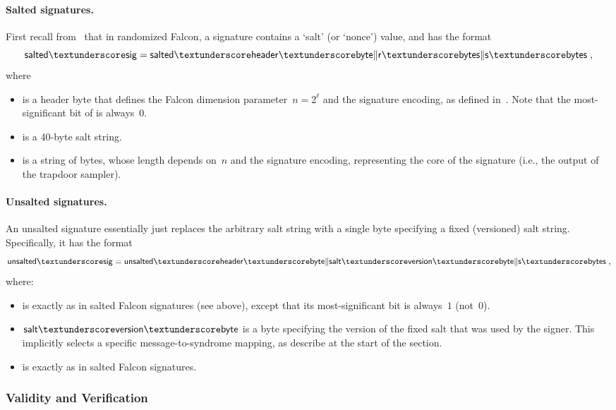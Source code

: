 \documentclass[11pt]{article}
\begin{document}
\paragraph{Salted signatures.}

First recall from~\cite[Section~3.11.3]{falcon} that in randomized
Falcon, a signature contains a `salt' (or `nonce') value, and has the
format
\[ \saltedsig = \saltedheaderbyte \| \rbytes \| \sbytes \; \text{,} \]
where
\begin{itemize}[itemsep=0pt]
\item \saltedheaderbyte is a header byte that defines the Falcon dimension
  parameter~$n=2^{\ell}$ and the signature encoding, as defined
  in~\cite[Section~3.11.3]{falcon}. Note that the most-significant bit
  of \saltedheaderbyte is always~$0$.
\item \rbytes is a $40$-byte salt string.
\item \sbytes is a string of bytes, whose length depends on~$n$ and
  the signature encoding, representing the core of the signature
  (i.e., the output of the trapdoor sampler).
\end{itemize}

\paragraph{Unsalted signatures.}

An unsalted signature \unsaltedsig essentially just replaces the
arbitrary salt string \rbytes with a single byte specifying a fixed
(versioned) salt string. Specifically, it has the format
\begin{equation}
  \label{eq:unsaltedsig}
  \unsaltedsig = \unsaltedheaderbyte \| \saltversionbyte \| \sbytes \;
  \text{,}
\end{equation}
where:
\begin{itemize}[itemsep=0pt]
\item \unsaltedheaderbyte is exactly as in salted Falcon signatures
  (see above), except that its most-significant bit is always~$1$
  (not~$0$).
\item $\saltversionbyte$ is a byte specifying the version of the fixed
  salt that was used by the signer. This implicitly selects a specific
  message-to-syndrome mapping, as describe at the start of the
  section.
\item \sbytes is exactly as in salted Falcon signatures.
\end{itemize}

\subsubsection{Validity and Verification}
\label{sec:sig-validity}
\end{document}
